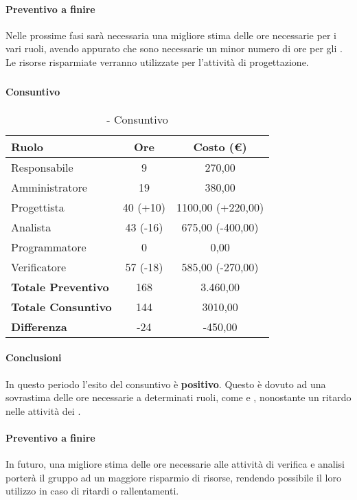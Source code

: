 \documentclass[./PianoDiProgetto.tex]{subfiles}
\begin{document}
			\paragraph{Preventivo a finire}
			Nelle prossime fasi sarà necessaria una migliore stima delle ore necessarie per i vari ruoli, avendo appurato che sono necessarie un minor numero di ore per gli \ANP{}. Le risorse risparmiate verranno utilizzate per l'attività di progettazione.
	\clearpage
\subsubsection{\PerPD}
\paragraph{Consuntivo}
		\begin{table}[h]
		\centering
		\begin{tabular}{l * {2}{c}}
			\toprule
			\textbf{Ruolo} & \textbf{Ore} & \textbf{Costo (\euro{})} \\
			\midrule
			Responsabile &	9 & 270,00 \\
			Amministratore & 19 & 380,00\\
			Progettista & 40 (+10) & 1100,00 (+220,00) \\
			Analista & 43 (-16) & 675,00 (-400,00) \\
			Programmatore & 0 & 0,00 \\
			Verificatore & 57 (-18) & 585,00 (-270,00) \\
			\midrule
			\textbf{Totale Preventivo} & 168
 & 3.460,00
 \\		
			\textbf{Totale Consuntivo} & 144 & 3010,00
 \\
			\midrule
			\textbf{Differenza} & -24 & -450,00 \\
			\bottomrule
		\end{tabular}
		\caption{\PerPD{} - Consuntivo}
		
	\end{table}	
	\paragraph{Conclusioni}
	In questo periodo l'esito del consuntivo è \textbf{positivo}. Questo è dovuto ad una sovrastima delle ore necessarie a determinati ruoli, come \AN{} e \VER{}, nonostante un ritardo nelle attività dei \PJP{}.
	
	\paragraph{Preventivo a finire}
	In futuro, una migliore stima delle ore necessarie alle attività di verifica e analisi porterà il gruppo ad un maggiore risparmio di risorse, rendendo possibile il loro utilizzo in caso di ritardi o rallentamenti.
	\clearpage
\end{document}

